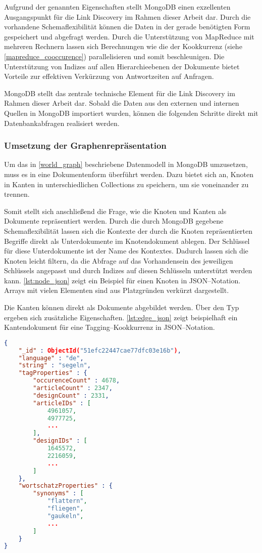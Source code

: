Aufgrund der genannten Eigenschaften stellt MongoDB einen exzellenten Ausgangspunkt für die Link Discovery im Rahmen dieser Arbeit dar. Durch die vorhandene Schemaflexibilität können die Daten in der gerade benötigten Form gespeichert und abgefragt werden. Durch die Unterstützung von MapReduce mit mehreren Rechnern lassen sich Berechnungen wie die der Kookkurrenz (siehe \cref{mapreduce_cooccurence}) parallelisieren und somit beschleunigen. Die Unterstützung von Indizes auf allen Hierarchieebenen der Dokumente bietet Vorteile zur effektiven Verkürzung von Antwortzeiten auf Anfragen.

MongoDB stellt das zentrale technische Element für die Link Discovery im Rahmen dieser Arbeit dar. Sobald die Daten aus den externen und internen Quellen in MongoDB importiert wurden, können die folgenden Schritte direkt mit Datenbankabfragen realisiert werden.

\subsubsection{Umsetzung der Graphenrepräsentation}

Um das in \cref{world_graph} beschriebene Datenmodell in MongoDB umzusetzen, muss es in eine Dokumentenform überführt werden. Dazu bietet sich an, Knoten in Kanten in unterschiedlichen Collections zu speichern, um sie voneinander zu trennen.

Somit stellt sich anschließend die Frage, wie die Knoten und Kanten als Dokumente repräsentiert werden. Durch die durch MongoDB gegebene Schemaflexibilität lassen sich die Kontexte der durch die Knoten repräsentierten Begriffe direkt als Unterdokumente im Knotendokument ablegen. Der Schlüssel für diese Unterdokumente ist der Name des Kontextes. Dadurch lassen sich die Knoten leicht filtern, da die Abfrage auf das Vorhandensein des jeweiligen Schlüssels angepasst und durch Indizes auf diesen Schlüsseln unterstützt werden kann. \cref{lst:node_json} zeigt ein Beispiel für einen Knoten in JSON--Notation. Arrays mit vielen Elementen sind aus Platzgründen verkürzt dargestellt.

Die Kanten können direkt als Dokumente abgebildet werden. Über den Typ ergeben sich zusätzliche Eigenschaften. \cref{lst:edge_json} zeigt beispielhaft ein Kantendokument für eine Tagging--Kookkurrenz in JSON--Notation.

\begin{lstlisting}[language=json, label={lst:node_json}, caption={JSON--Beispiel für ein Knotendokument in MongoDB}, float]
{
    "_id" : ObjectId("51efc22447cae77dfc03e16b"),
    "language" : "de",
    "string" : "segeln",
    "tagProperties" : {
        "occurenceCount" : 4678,
        "articleCount" : 2347,
        "designCount" : 2331,
        "articleIDs" : [ 
            4961057, 
            4977725, 
            ...
        ],
        "designIDs" : [ 
            1645572, 
            2216059, 
            ...
        ]
    },
    "wortschatzProperties" : {
        "synonyms" : [ 
            "flattern", 
            "fliegen", 
            "gaukeln", 
            ...
        ]
    }
}
\end{lstlisting}

